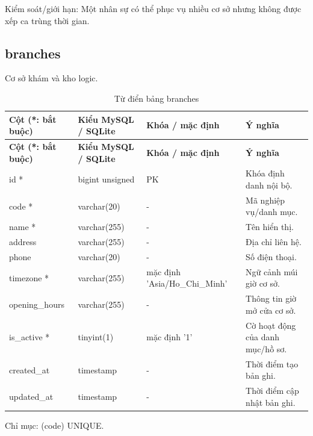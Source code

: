 Kiểm soát/\allowbreak{}giới hạn:\allowbreak{} Một nhân sự có thể phục vụ nhiều cơ sở nhưng không được xếp ca trùng thời gian.\allowbreak{}

\clearpage

\subsection{branches}
Cơ sở khám và kho logic.\allowbreak{}


{\fontsize{10}{12}\selectfont\setlength{\tabcolsep}{3pt}\renewcommand{\arraystretch}{1.12}
\begin{longtable}{@{}L{\textwidth-4.86pt\relax} L{\textwidth-3.96pt\relax} L{\textwidth-2.88pt\relax} L{\textwidth-6.3pt\relax}@{}}
\caption{Từ điển bảng branches}\\
\toprule
\textbf{Cột (*:\allowbreak{} bắt buộc)} & \textbf{Kiểu My\allowbreak{}SQL /\allowbreak{} SQLite} & \textbf{Khóa /\allowbreak{} mặc định} & \textbf{Ý nghĩa}\\\midrule
\endfirsthead
\toprule
\textbf{Cột (*:\allowbreak{} bắt buộc)} & \textbf{Kiểu My\allowbreak{}SQL /\allowbreak{} SQLite} & \textbf{Khóa /\allowbreak{} mặc định} & \textbf{Ý nghĩa}\\\midrule
\endhead
\bottomrule\endlastfoot
id * & bigint unsigned & PK & Khóa định danh nội bộ.\allowbreak{}\\[1pt]
code * & varchar(20) & - & Mã nghiệp vụ/\allowbreak{}danh mục.\allowbreak{}\\[1pt]
name * & varchar(255) & - & Tên hiển thị.\allowbreak{}\\[1pt]
address & varchar(255) & - & Địa chỉ liên hệ.\allowbreak{}\\[1pt]
phone & varchar(20) & - & Số điện thoại.\allowbreak{}\\[1pt]
timezone * & varchar(255) & mặc định 'Asia/\allowbreak{}Ho\_\allowbreak{}Chi\_\allowbreak{}Minh' & Ngữ cảnh múi giờ cơ sở.\allowbreak{}\\[1pt]
opening\_\allowbreak{}hours & varchar(255) & - & Thông tin giờ mở cửa cơ sở.\allowbreak{}\\[1pt]
is\_\allowbreak{}active * & tinyint(1) & mặc định '1' & Cờ hoạt động của danh mục/\allowbreak{}hồ sơ.\allowbreak{}\\[1pt]
created\_\allowbreak{}at & timestamp & - & Thời điểm tạo bản ghi.\allowbreak{}\\[1pt]
updated\_\allowbreak{}at & timestamp & - & Thời điểm cập nhật bản ghi.\allowbreak{}\\[1pt]
\end{longtable}}
Chỉ mục:\allowbreak{} (code) UNIQUE.\allowbreak{}

